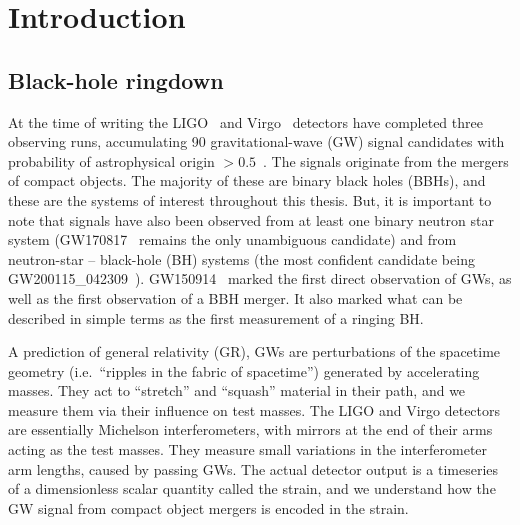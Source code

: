 
\chapter{Introduction} %

\label{Chapter1} %

\section{Black-hole ringdown}


At the time of writing the 
LIGO~\cite{LIGOScientific:2014pky} and Virgo~\cite{VIRGO:2014yos} detectors have completed three observing runs, accumulating 90 gravitational-wave (GW) signal candidates with probability of astrophysical origin $> 0.5$~\cite{LIGOScientific:2018mvr, LIGOScientific:2020ibl, LIGOScientific:2021usb, LIGOScientific:2021djp}.
The signals originate from the mergers of compact objects. 
The majority of these are binary black holes (BBHs), and these are the systems of interest throughout this thesis.  
But, it is important to note that signals have also been observed from at least one binary neutron star system (GW170817~\cite{LIGOScientific:2017vwq} remains the only unambiguous candidate) and from neutron-star -- black-hole (BH) systems (the most confident candidate being GW200115\_042309~\cite{LIGOScientific:2021qlt}).
GW150914~\cite{LIGOScientific:2016aoc} marked the first direct observation of GWs, as well as the first observation of a BBH merger.
It also marked what can be described in simple terms as the first measurement of a ringing BH.

A prediction of general relativity (GR), GWs are perturbations of the spacetime geometry (i.e.\ ``ripples in the fabric of spacetime'') generated by accelerating masses.
They act to ``stretch'' and ``squash'' material in their path, and we measure them via their influence on test masses.
The LIGO and Virgo detectors are essentially Michelson interferometers, with mirrors at the end of their arms acting as the test masses.
They measure small variations in the interferometer arm lengths, caused by passing GWs.
The actual detector output is a timeseries of a dimensionless scalar quantity called the strain, and we understand how the GW signal from compact object mergers is encoded in the strain.

